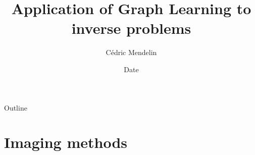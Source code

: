 \documentclass[aspectratio=169]{beamer}
\title              {Application of Graph Learning to inverse problems}
\author     		{Cédric Mendelin}
\institute          {Department of Mathematics and Computer Science, University of Basel}
\date               {Date}
\begin{document}

\begin{frame}[t,plain]
    \titlepage
\end{frame}

\begin{frame}[t]{Outline}
    \tableofcontents
\end{frame}



\section{Imaging methods}	%
\end{document}

